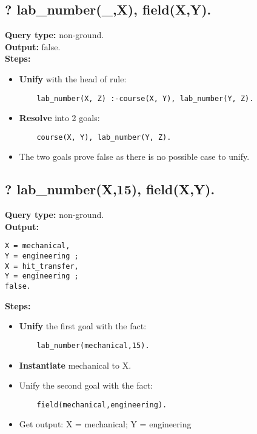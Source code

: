 \subsection{? lab\_number(\_,X), field(X,Y).}
\textbf{Query type: } non-ground. \\
\textbf{Output:} false. \\
\textbf{Steps:}
\begin{itemize}
    \item \textbf{Unify} with the head of rule:
    \begin{lstlisting}
    lab_number(X, Z) :-course(X, Y), lab_number(Y, Z).
    \end{lstlisting}
    \item \textbf{Resolve} into 2 goals:
    \begin{lstlisting}
    course(X, Y), lab_number(Y, Z).
    \end{lstlisting}
    \item The two goals prove false as there is no possible case to unify.  
\end{itemize}

\newpage
\subsection{? lab\_number(X,15), field(X,Y).}
\textbf{Query type: } non-ground. \\
\textbf{Output:} \\
\begin{lstlisting}
X = mechanical,
Y = engineering ;
X = hit_transfer,
Y = engineering ;
false.
\end{lstlisting}

\textbf{Steps:}
\begin{itemize}
    \item \textbf{Unify} the first goal with the fact:
    \begin{lstlisting}
    lab_number(mechanical,15).
    \end{lstlisting}
    \item \textbf{Instantiate} mechanical to X.
    \item Unify the second goal with the fact:
    \begin{lstlisting}
    field(mechanical,engineering).
    \end{lstlisting}
\item Get output: X = mechanical; Y = engineering
\end{itemize}

